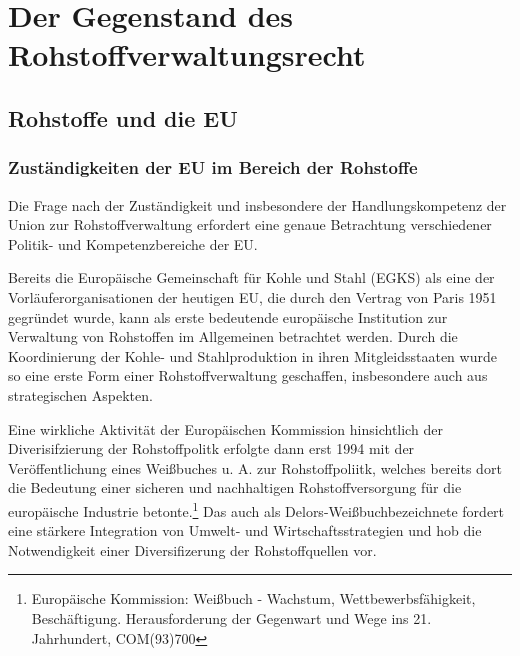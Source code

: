\documentclass[12pt,a4paper,oneside]{book} %
\begin{document}
	
	\chapter{Der Gegenstand des Rohstoffverwaltungsrecht}
	
	\section{Rohstoffe und die EU}
	
	\subsection{Zuständigkeiten der EU im Bereich der Rohstoffe}
	
	Die Frage nach der Zuständigkeit und insbesondere der Handlungskompetenz der Union zur Rohstoffverwaltung erfordert eine genaue Betrachtung verschiedener Politik- und Kompetenzbereiche der EU.
	
	Bereits die Europäische Gemeinschaft für Kohle und Stahl (EGKS) als eine der Vorläuferorganisationen der heutigen EU, die durch den Vertrag von Paris 1951 gegründet wurde, kann als erste bedeutende europäische Institution zur Verwaltung von Rohstoffen im Allgemeinen betrachtet werden. Durch die Koordinierung der Kohle- und Stahlproduktion in ihren Mitgleidsstaaten wurde so eine erste Form einer Rohstoffverwaltung geschaffen, insbesondere auch aus strategischen Aspekten.%
	
	Eine wirkliche Aktivität der Europäischen Kommission hinsichtlich der Diverisifzierung der Rohstoffpolitk erfolgte dann erst 1994 mit der Veröffentlichung eines Weißbuches u. A. zur Rohstoffpoliitk, welches bereits dort die Bedeutung einer sicheren und nachhaltigen Rohstoffversorgung für die europäische Industrie betonte.\footnote{Europäische Kommission: Weißbuch - Wachstum, Wettbewerbsfähigkeit, Beschäftigung. Herausforderung der Gegenwart und Wege ins 21. Jahrhundert, COM(93)700}
	Das auch als \glqq Delors-Weißbuch\grqq bezeichnete  fordert eine stärkere Integration von Umwelt- und Wirtschaftsstrategien und hob die Notwendigkeit einer Diversifizerung der Rohstoffquellen vor.
	
\end{document}
